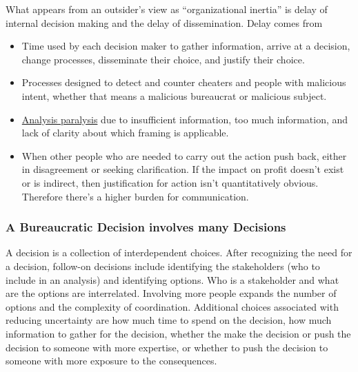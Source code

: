 What appears from an outsider's view as ``organizational inertia'' is  delay of internal decision making and the delay of dissemination. 
Delay comes from
\begin{itemize}
    \item Time used by each decision maker to gather information, arrive at a decision, change processes, disseminate their choice, and justify their choice. 
    \item Processes designed to detect and counter cheaters and people with malicious intent, whether that means a malicious bureaucrat or malicious subject. 
\item \href{https://en.wikipedia.org/wiki/Analysis_paralysis}{Analysis paralysis} due to insufficient information, too much information, and lack of clarity about which framing is applicable.
\item When other people who are needed to carry out the action push back, either in disagreement or seeking clarification. If the impact on profit doesn't exist or is indirect, then justification for action isn't quantitatively obvious. Therefore there's a higher burden for communication.
\end{itemize}




\subsubsection{A Bureaucratic Decision involves many Decisions}

A decision is a collection of interdependent choices. After recognizing the need for a decision, follow-on decisions include identifying the stakeholders (who to include in an analysis) and identifying options. Who is a stakeholder and what are the options are interrelated. Involving more people expands the number of options and the complexity of coordination. Additional choices associated with reducing uncertainty are how much time to spend on the decision, how much information to gather for the decision, whether the make the decision or push the decision to someone with more expertise, or whether to push the decision to someone with more exposure to the consequences.

